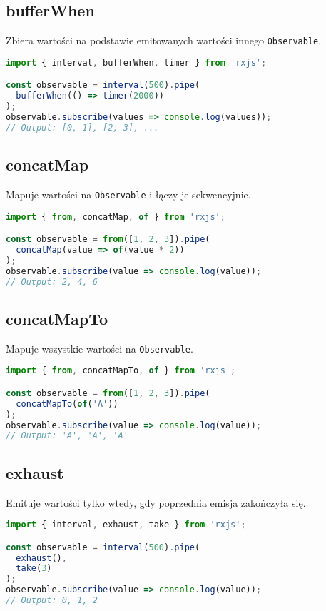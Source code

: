 \documentclass[a4paper,12pt]{article}
\begin{document}
\subsection{bufferWhen}
Zbiera wartości na podstawie emitowanych wartości innego \texttt{Observable}.

\begin{lstlisting}[language=JavaScript, caption=Przykład użycia \texttt{bufferWhen}]
import { interval, bufferWhen, timer } from 'rxjs';

const observable = interval(500).pipe(
  bufferWhen(() => timer(2000))
);
observable.subscribe(values => console.log(values));
// Output: [0, 1], [2, 3], ...
\end{lstlisting}

\subsection{concatMap}
Mapuje wartości na \texttt{Observable} i łączy je sekwencyjnie.

\begin{lstlisting}[language=JavaScript, caption=Przykład użycia \texttt{concatMap}]
import { from, concatMap, of } from 'rxjs';

const observable = from([1, 2, 3]).pipe(
  concatMap(value => of(value * 2))
);
observable.subscribe(value => console.log(value));
// Output: 2, 4, 6
\end{lstlisting}

\subsection{concatMapTo}
Mapuje wszystkie wartości na \texttt{Observable}.

\begin{lstlisting}[language=JavaScript, caption=Przykład użycia \texttt{concatMapTo}]
import { from, concatMapTo, of } from 'rxjs';

const observable = from([1, 2, 3]).pipe(
  concatMapTo(of('A'))
);
observable.subscribe(value => console.log(value));
// Output: 'A', 'A', 'A'
\end{lstlisting}

\subsection{exhaust}
Emituje wartości tylko wtedy, gdy poprzednia emisja zakończyła się.

\begin{lstlisting}[language=JavaScript, caption=Przykład użycia \texttt{exhaust}]
import { interval, exhaust, take } from 'rxjs';

const observable = interval(500).pipe(
  exhaust(),
  take(3)
);
observable.subscribe(value => console.log(value));
// Output: 0, 1, 2
\end{lstlisting}
\end{document}
